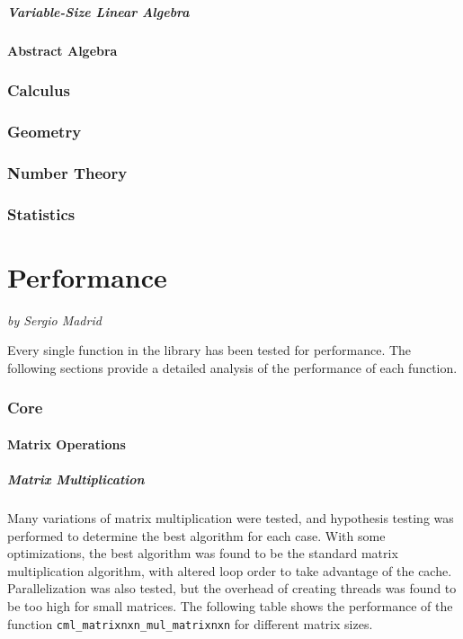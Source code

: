 \documentclass[a4paper,oneside,8pt]{extarticle}
\newcommand{\authoredpart}[2]{
  \clearpage
  \part{#1}
  \vspace{-1em} %
  \Large{\textit{by #2}}
  \vspace{2em} %
}
\theoremstyle{definition}
\begin{document}
\subsubsection{Variable-Size Linear Algebra}

\subsection{Abstract Algebra}

\section{Calculus} \label{sec:calculus}

\section{Geometry} \label{sec:geometry}

\section{Number Theory} \label{sec:number_theory}

\section{Statistics} \label{sec:statistics}


\authoredpart{Performance}{Sergio Madrid}

Every single function in the library has been tested for performance. The following sections provide a detailed analysis of the performance of each function.

\section{Core}

\subsection{Matrix Operations}

\subsubsection{Matrix Multiplication}

Many variations of matrix multiplication were tested, and hypothesis testing was performed to determine the best algorithm for each case. With some optimizations, the best algorithm was found to be the standard matrix multiplication algorithm, with altered loop order to take advantage of the cache. Parallelization was also tested, but the overhead of creating threads was found to be too high for small matrices. The following table shows the performance of the function \texttt{cml\_matrixnxn\_mul\_matrixnxn} for different matrix sizes.
\end{document}
